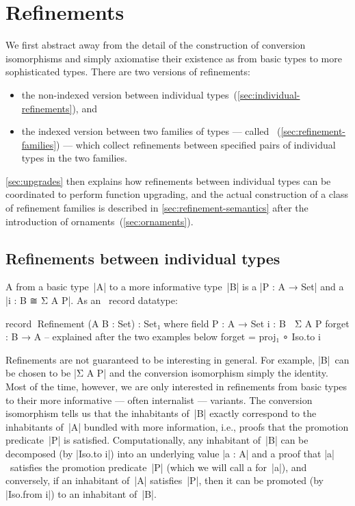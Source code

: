 \section{Refinements}
\label{sec:refinements}

We first abstract away from the detail of the construction of conversion isomorphisms and simply axiomatise their existence as  from basic types to more sophisticated types.
There are two versions of refinements:
\begin{itemize}
\item the non-indexed version between individual types~(\autoref{sec:individual-refinements}), and
\item the indexed version between two families of types --- called ~(\autoref{sec:refinement-families}) --- which collect refinements between specified pairs of individual types in the two families.
\end{itemize}
\autoref{sec:upgrades} then explains how refinements between individual types can be coordinated to perform function upgrading, and the actual construction of a class of refinement families is described in \autoref{sec:refinement-semantics} after the introduction of ornaments~(\autoref{sec:ornaments}).

\subsection{Refinements between individual types}
\label{sec:individual-refinements}

A  from a basic type~|A| to a more informative type~|B| is a  |P : A → Set| and a  |i : B ≅ Σ A P|.
As an \Agda\ record datatype:
\begin{code}
record ^^^Refinement (A B : Set) : Set₁ where
  field
    P  :  A → Set
    i  :  B ≅ Σ A P
  forget : B → A  -- explained after the two examples below
  forget = proj₁ ∘ Iso.to i
\end{code}
Refinements are not guaranteed to be interesting in general.
For example, |B|~can be chosen to be |Σ A P| and the conversion isomorphism simply the identity.
Most of the time, however, we are only interested in refinements from basic types to their more informative --- often internalist --- variants.
The conversion isomorphism tells us that the inhabitants of~|B| exactly correspond to the inhabitants of~|A| bundled with more information, i.e., proofs that the promotion predicate~|P| is satisfied.
Computationally, any inhabitant of~|B| can be decomposed (by |Iso.to i|\kern1pt) into an underlying value |a : A| and a proof that |a|~satisfies the promotion predicate~|P| (which we will call a  for~|a|), and conversely, if an inhabitant of~|A| satisfies~|P|, then it can be promoted (by |Iso.from i|\kern1pt) to an inhabitant of~|B|.

